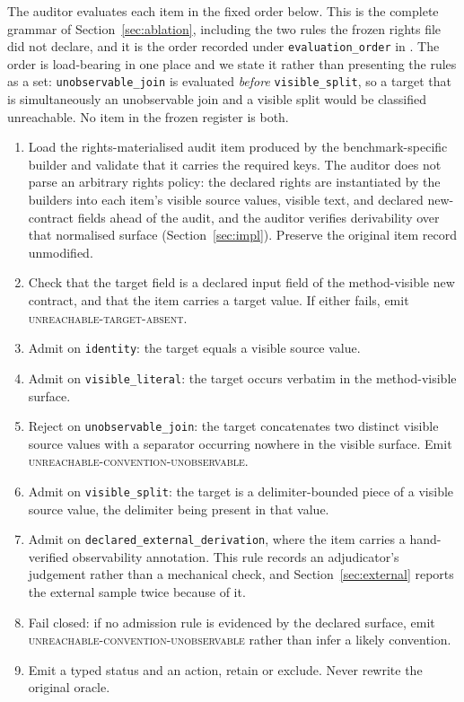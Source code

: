 \documentclass[11pt]{article}
\newcommand{\artifact}[1]{\path{#1}}
\newcommand{\st}[1]{\textsc{\small #1}}
\begin{document}
The auditor evaluates each item in the fixed order below. This is the complete
grammar of Section~\ref{sec:ablation}, including the two rules the frozen
rights file did not declare, and it is the order recorded under
\texttt{evaluation\_order} in
\artifact{research/gate19/derivation\_grammar.json}. The order is load-bearing
in one place and we state it rather than presenting the rules as a set:
\texttt{unobservable\_join} is evaluated \emph{before} \texttt{visible\_split},
so a target that is simultaneously an unobservable join and a visible split
would be classified unreachable. No item in the frozen register is both.

\begin{enumerate}
  \item Load the rights-materialised audit item produced by the
  benchmark-specific builder and validate that it carries the required keys.
  The auditor does not parse an arbitrary rights policy: the declared rights
  are instantiated by the builders into each item's visible source values,
  visible text, and declared new-contract fields ahead of the audit, and the
  auditor verifies derivability over that normalised surface
  (Section~\ref{sec:impl}). Preserve the original item record unmodified.
  \item Check that the target field is a declared input field of the
  method-visible new contract, and that the item carries a target value. If
  either fails, emit \st{unreachable-target-absent}.
  \item Admit on \texttt{identity}: the target equals a visible source value.
  \item Admit on \texttt{visible\_literal}: the target occurs verbatim in the
  method-visible surface.
  \item Reject on \texttt{unobservable\_join}: the target concatenates two
  distinct visible source values with a separator occurring nowhere in the
  visible surface. Emit \st{unreachable-convention-unobservable}.
  \item Admit on \texttt{visible\_split}: the target is a delimiter-bounded
  piece of a visible source value, the delimiter being present in that value.
  \item Admit on \texttt{declared\_external\_derivation}, where the item
  carries a hand-verified observability annotation. This rule records an
  adjudicator's judgement rather than a mechanical check, and
  Section~\ref{sec:external} reports the external sample twice because of it.
  \item Fail closed: if no admission rule is evidenced by the declared
  surface, emit \st{unreachable-convention-unobservable} rather than infer a
  likely convention.
  \item Emit a typed status and an action, retain or exclude. Never rewrite
  the original oracle.
\end{enumerate}
\end{document}
